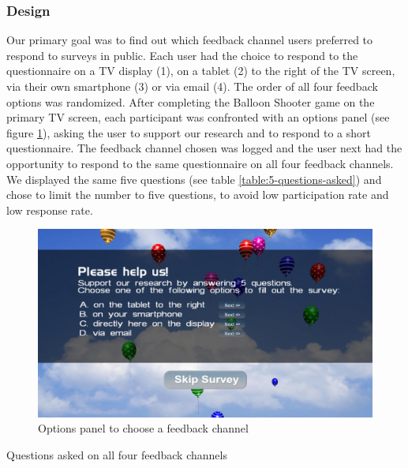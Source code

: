 	\subsubsection{Design}
	\label{chapter:field-study:design}

	Our primary goal was to find out which feedback channel users preferred to respond to surveys in public. Each user had the choice to respond to the questionnaire on a TV display (1), on a tablet (2) to the right of the TV screen, via their own smartphone (3) or via email (4). The order of all four feedback options was randomized.
	After completing the Balloon Shooter game on the primary TV screen, each participant was confronted with an options panel (see figure \ref{fig:5-feedback-options}), asking the user to support our research and to respond to a short questionnaire. The feedback channel chosen was logged and the user next had the opportunity to respond to the same questionnaire on all four feedback channels. 
	We displayed the same five questions (see table \ref{table:5-questions-asked}) and chose to limit the number to five questions, to avoid low participation rate and low response rate.

	\begin{figure}
	    \begin{center}
			\includegraphics[width=.7\columnwidth]{img/screenshots/balloon-game/options-overview.jpg}
	    \end{center}
	 \caption[Feedback Channel: Options Panel]{Options panel to choose a feedback channel}
	 \label{fig:5-feedback-options}
	\end{figure}

	\begin{table}[h]
		\label{table:5-questions-asked}
		\small
		\center
		
		\caption[Questions asked]{Questions asked on all four feedback channels}
	\end{table}

